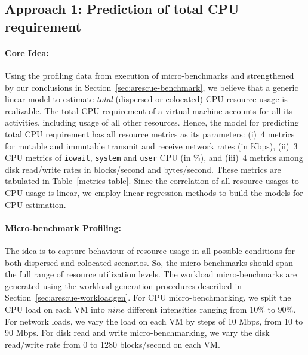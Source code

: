 \subsection{Approach 1: Prediction of total CPU requirement}

\paragraph{Core Idea: } Using the profiling data from 
execution of micro-benchmarks and strengthened
by our conclusions in Section~\ref{sec:arescue-benchmark}, we 
believe that a generic linear model to estimate 
\textit{total} (dispersed or colocated) CPU resource usage
is realizable. 
The total CPU requirement of a virtual machine accounts for all its
activities, including usage of all other resources. Hence, the model
for predicting total CPU requirement has all resource metrics as its
parameters: (i)~$4$ metrics for mutable and
immutable transmit and receive network rates (in Kbps),
(ii)~$3$ CPU metrics of \texttt{iowait}, \texttt{system}
and \texttt{user} CPU (in \%), and
(iii)~$4$ metrics among disk read/write rates in
blocks/second and bytes/second. These metrics are
tabulated in Table~\ref{metrics-table}.
Since the correlation of all resource usages to CPU usage is linear, we employ
linear regression methods to build the models for CPU estimation.

\paragraph{Micro-benchmark Profiling: } The idea is to capture 
behaviour of resource usage in all possible conditions
for both dispersed and colocated scenarios. So, the micro-benchmarks
should span the full range of resource utilization levels. 
The workload micro-benchmarks are generated using the workload
generation procedures described in Section~\ref{sec:arescue-workloadgen}.
For CPU micro-benchmarking, we split the CPU load on each VM
into $nine$ different intensities
ranging from $10\%$ to $90\%$. 
For network loads, we vary the load on each VM by steps 
of 10 Mbps, from 10 to 90 Mbps.
For disk read and write
micro-benchmarking, we vary the disk read/write rate from 
0 to 1280 blocks/second on each VM.


% 

